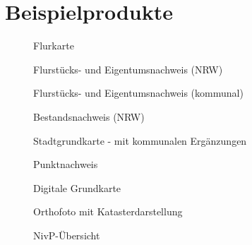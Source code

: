 \chapter{Beispielprodukte}
\begin{figure}[htbp]
	\centering
	\caption[]{Flurkarte}
	\label{fig:flurkarte}
\end{figure}
\begin{figure}[htbp]
	\centering
	\caption[]{Flurstücks- und Eigentumsnachweis (NRW)}
	\label{fig:eigentumsnachweis_nrw}
\end{figure}
\begin{figure}[htbp]
	\centering
	\caption[]{Flurstücks- und Eigentumsnachweis (kommunal)}
	\label{fig:eigentumsnachweis_kom}
\end{figure}
\begin{figure}[htbp]
	\centering
	\caption[]{Bestandsnachweis (NRW)}
	\label{fig:bestandsnachweis_nrw}
\end{figure}
\begin{figure}[htbp]
	\centering
	\caption[]{Stadtgrundkarte - mit kommunalen Ergänzungen}
	\label{fig:stadtgrundkarte}
\end{figure}
\begin{figure}[htbp]
	\centering
	\caption[]{Punktnachweis}
	\label{fig:punktnachweis}
\end{figure}
\begin{figure}[htbp]
	\centering
	\caption[]{Digitale Grundkarte}
	\label{fig:digitale_grundkarte}
\end{figure}
\begin{figure}[htbp]
	\centering
	\caption[]{Orthofoto mit Katasterdarstellung}
	\label{fig:orthofoto-katasterdarstellung}
\end{figure}
\begin{figure}[htbp]
	\centering
	\caption[]{NivP-Übersicht}
	\label{fig:nivp-uebersicht}
\end{figure}

